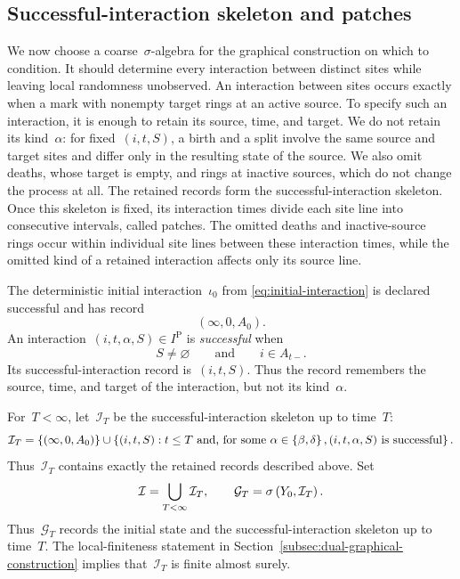 \subsection{Successful-interaction skeleton and patches}
\label{sec:patches}

We now choose a coarse~$\sigma$-algebra for the graphical construction on which
to condition. It should determine every interaction between distinct sites
while leaving local randomness unobserved. An interaction between sites occurs
exactly when a mark with nonempty target rings at an active source. To specify
such an interaction, it is enough to retain its source, time, and target. We do
not retain its kind~$\alpha$: for fixed~$(i,t,S)$, a birth and a split involve
the same source and target sites and differ only in the resulting state of the
source. We also omit deaths, whose target is empty, and rings at inactive
sources, which do not change the process at all. The retained records form the
successful-interaction skeleton. Once this skeleton is fixed, its interaction
times divide each site line into consecutive intervals, called patches. The
omitted deaths and inactive-source rings occur within individual site lines
between these interaction times, while the omitted kind of a retained
interaction affects only its source line.

\begin{definition}
\label{def:successful-interaction}
The deterministic initial interaction~$\iota_0$ from
\eqref{eq:initial-interaction} is declared successful and has record
\begin{equation*}
(\infty,0,A_0).
\end{equation*}
An interaction~$(i,t,\alpha,S)\in I^{\mathrm P}$ is
\emph{successful} when
\begin{equation*}
S\neq\varnothing
\qquad\text{and}\qquad
i\in A_{t-}.
\end{equation*}
Its successful-interaction record is~$(i,t,S)$. Thus the record remembers the
source, time, and target of the interaction, but not its kind~$\alpha$.
\end{definition}

For~$T<\infty$, let~$\mathcal I_T$ be the successful-interaction skeleton up to
time~$T$:
\begin{equation*}
\mathcal I_T
=
\left\{(\infty,0,A_0)\right\}
\cup
\left\{(i,t,S):t\leq T\text{ and, for some }\alpha\in\left\{\beta,\delta\right\},
(i,t,\alpha,S)\text{ is successful}\right\}.
\end{equation*}
Thus~$\mathcal I_T$ contains exactly the retained records described above. Set
\begin{equation*}
\mathcal I=\bigcup_{T<\infty}\mathcal I_T,
\qquad
\mathcal G_T=\sigma\left(Y_0,\mathcal I_T\right).
\end{equation*}
Thus~$\mathcal G_T$ records the initial state and the successful-interaction
skeleton up to time~$T$. The local-finiteness statement in
Section~\ref{subsec:dual-graphical-construction} implies that~$\mathcal I_T$ is
finite almost surely.

